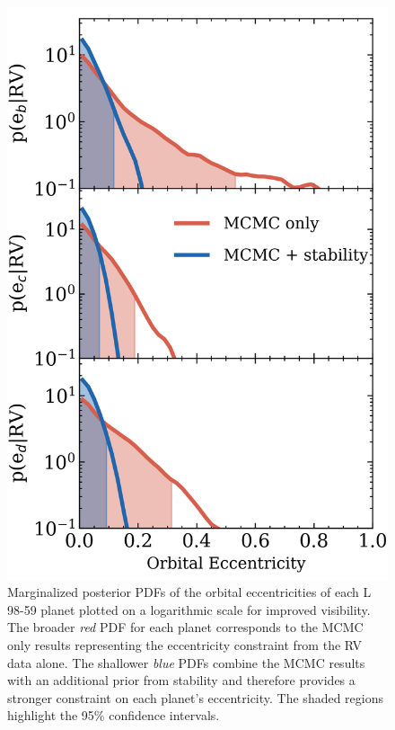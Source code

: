 \documentclass[longauth]{aa}
\begin{document}
\begin{figure}
    \centering
    \includegraphics[width=.9\hsize]{eccpostv3.png}
    \caption{Marginalized posterior PDFs of the orbital eccentricities of each L 98-59 planet plotted on a logarithmic scale for improved visibility. The broader \emph{red} PDF for each planet corresponds to the MCMC only results representing the eccentricity constraint from the RV data alone. The shallower \emph{blue} PDFs combine the MCMC results with an additional prior from stability and therefore provides a stronger constraint on each planet's eccentricity. The shaded regions highlight the 95\% confidence intervals.}
    \label{fig:ecc}
\end{figure}
\end{document}
